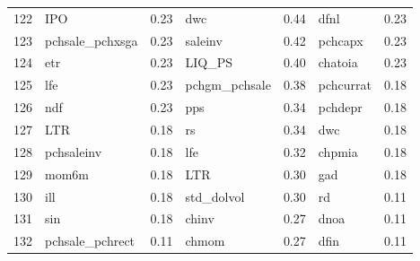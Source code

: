 \begin{footnotesize}
\begin{longtable}{rlc|lc|lc}
		122                       & IPO                         & 0.23                          & dwc                         & 0.44                          & dfnl                              & 0.23           \\
		123                       & pchsale\_pchxsga            & 0.23                          & saleinv                     & 0.42                          & pchcapx                           & 0.23           \\
		124                       & etr                         & 0.23                          & LIQ\_PS                     & 0.40                          & chatoia                           & 0.23           \\
		125                       & lfe                         & 0.23                          & pchgm\_pchsale              & 0.38                          & pchcurrat                         & 0.18           \\
		126                       & ndf                         & 0.23                          & pps                         & 0.34                          & pchdepr                           & 0.18           \\
		127                       & LTR                         & 0.18                          & rs                          & 0.34                          & dwc                               & 0.18           \\
		128                       & pchsaleinv                  & 0.18                          & lfe                         & 0.32                          & chpmia                            & 0.18           \\
		129                       & mom6m                       & 0.18                          & LTR                         & 0.30                          & gad                               & 0.18           \\
		130                       & ill                         & 0.18                          & std\_dolvol                 & 0.30                          & rd                                & 0.11           \\
		131                       & sin                         & 0.18                          & chinv                       & 0.27                          & dnoa                              & 0.11           \\
		132                       & pchsale\_pchrect            & 0.11                          & chmom                       & 0.27                          & dfin                              & 0.11           \\

\end{longtable}
\end{footnotesize}

